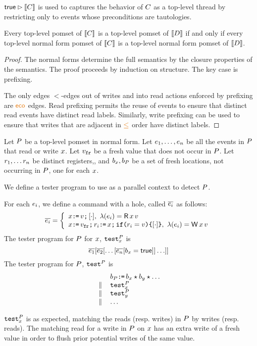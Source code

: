 $\mathsf{true}\mathbin\rhd \llbracket C\rrbracket$ is used to captures the behavior of $C$ as a top-level thread by restricting only to events whose 
preconditions are tautologies.
\begin{lemma}\label{unrhd}
Every top-level pomset of $\llbracket C\rrbracket$ is a top-level pomset of $\llbracket D\rrbracket$ if and only if 
every top-level normal form pomset of $\llbracket C\rrbracket$ is a top-level normal form pomset of $\llbracket D\rrbracket$.
\begin{proof}
The normal forms determine the full semantics by the closure properties of the semantics.     The proof proceeds by induction on structure.  The key case is prefixing. 

The only edges $\lt$-edges out of writes  and into read actions enforced by prefixing are $\reco$ edges.  Read prefixing permits the reuse of events to ensure that distinct read events have distinct read labels.  Similarly, write prefixing can be used to ensure that  writes that are adjacent in $\gtN$ order have distinct labels.
\end{proof}
\end{lemma}



Let $P$ be a top-level pomset in normal form.  Let $e_1, \ldots, e_n$ be all the events in $P$ that read or write $x$.  Let $v_{{\tt fr}}$ be a fresh value that does not occur in $P$.  Let $r_1, \ldots r_n$ be distinct registers,, and $b_{x}, b_{P}$ be a  set of fresh locations, not occurring in $P$, one for each $x$.


We define a tester program to use as a parallel context to detect $P$. 
\begin{definition}\label{testAPS}
For each $e_i$, we define a command with a hole, called $\overline{e_i}$ as follows:
\[
\test{\aEv_i} = \left\{ 
                             \begin{array}{l}
                              \aLoc\GETS\aVal \SEMI \hole{\cdot}, \ \labeling(\aEv_i) = \DR{\aLoc}{\aVal} \\
                              \aLoc\GETS\freshaval\SEMI \aReg_i \GETS\aLoc \SEMI \IF{\aReg_i = \aVal} \THEN \hole{\cdot} \FI , \ \labeling(\aEv_i) = \DW{\aLoc}{\aVal} \\
                           \end{array}
                       \right.
\]    
The tester program for $P$ for $x$, ${\tt test}^{P}_{x}$ is \[ \overline{e_1}[\overline{e_2}[\ldots [\overline{e_n}[b_{x} = \mathsf{true}]]\ldots]] \]
The tester program for $P$, ${\tt test}^{P}_{}$ is 
\[
\begin{array}{ll}
& b_{P}\texttt{:}\mkern-1mu\texttt{=}\, b_{x} \star b_{y} \star  \ldots   \\
\,\mathbin{\|}\, & {\tt test}^{P}_{x} \\
\,\mathbin{\|}\, & {\tt test}^{P}_{y} \\
 \,\mathbin{\|}\,  & \ldots 
\end{array}
\]
\end{definition}
 ${\tt test}^{P}_{x}$ is as expected, matching the reads (resp. writes) in $P$ by writes (resp. reads).  The matching read for a write in $P$ on $x$ has an extra write of a fresh value in order to flush prior potential writes of the same value.    

